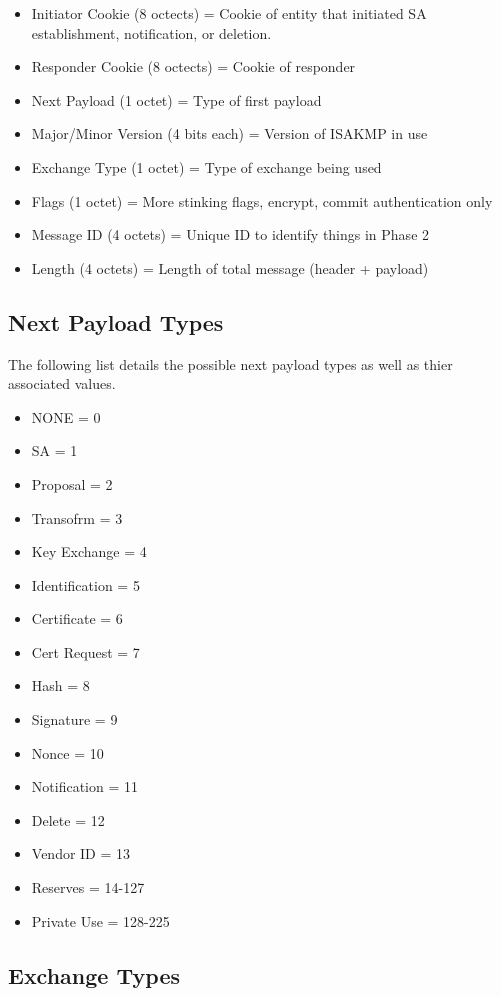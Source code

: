 \documentclass{article}
\begin{document}
\begin{itemize}
\item Initiator Cookie (8 octects) = Cookie of entity that initiated SA establishment, notification, or deletion.
\item Responder Cookie (8 octects) = Cookie of responder 
\item Next Payload (1 octet) = Type of first payload
\item Major/Minor Version (4 bits each) = Version of ISAKMP in use
\item Exchange Type (1 octet) = Type of exchange being used
\item Flags (1 octet) = More stinking flags, encrypt, commit authentication only
\item Message ID (4 octets) = Unique ID to identify things in Phase 2
\item Length (4 octets) = Length of total message (header + payload)
\end{itemize}

\subsection {Next Payload Types}

The following list details the possible next payload types as well as thier associated values.

\begin{itemize}
\item NONE = 0
\item SA = 1
\item Proposal = 2
\item Transofrm = 3
\item Key Exchange = 4
\item Identification = 5
\item Certificate = 6
\item Cert Request = 7
\item Hash = 8
\item Signature = 9
\item Nonce = 10
\item Notification = 11
\item Delete = 12
\item Vendor ID = 13
\item Reserves = 14-127
\item Private Use = 128-225
\end{itemize}

\subsection {Exchange Types}
\end{document}
